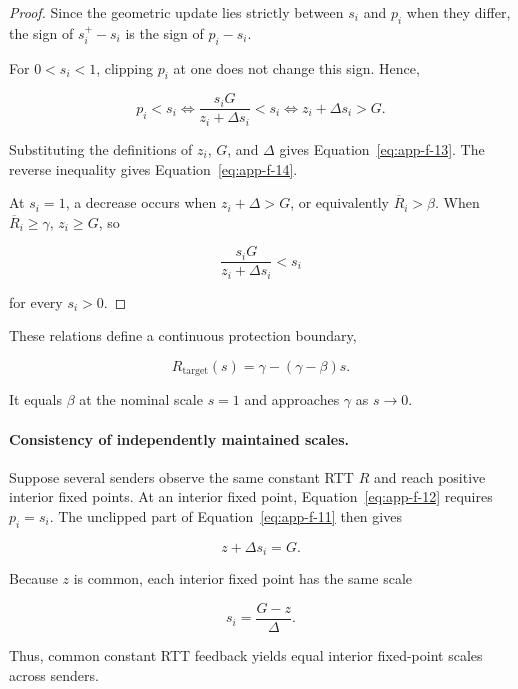 \begin{proof} Since the geometric update lies strictly between \(s_i\) and \(p_i\) when they differ, the sign of \(s_i^+-s_i\) is the sign of \(p_i-s_i\).

For \(0<s_i<1\), clipping \(p_i\) at one does not change this sign. Hence,

\[
p_i<s_i
\Longleftrightarrow
\frac{s_iG}{z_i+\Delta s_i}<s_i
\Longleftrightarrow
z_i+\Delta s_i>G.
\]

Substituting the definitions of \(z_i\), \(G\), and \(\Delta\) gives Equation~\eqref{eq:app-f-13}. The reverse inequality gives Equation~\eqref{eq:app-f-14}.

At \(s_i=1\), a decrease occurs when \(z_i+\Delta>G\), or equivalently \(\overline R_i>\beta\). When \(\overline R_i\ge\gamma\), \(z_i\ge G\), so

\[
\frac{s_iG}{z_i+\Delta s_i}<s_i
\]

for every \(s_i>0\).
\end{proof}

These relations define a continuous protection boundary,

\begin{equation}
\label{eq:app-f-15}
R_{\mathrm{target}}(s)
=
\gamma-(\gamma-\beta)s.
\end{equation}

It equals \(\beta\) at the nominal scale \(s=1\) and approaches \(\gamma\) as \(s\to0\).

\paragraph{Consistency of independently maintained scales.}

Suppose several senders observe the same constant RTT \(R\) and reach positive interior fixed points. At an interior fixed point, Equation~\eqref{eq:app-f-12} requires \(p_i=s_i\). The unclipped part of Equation~\eqref{eq:app-f-11} then gives

\begin{equation}
\label{eq:app-f-16}
z+\Delta s_i=G.
\end{equation}

Because \(z\) is common, each interior fixed point has the same scale

\begin{equation}
\label{eq:app-f-17}
s_i=\frac{G-z}{\Delta}.
\end{equation}

Thus, common constant RTT feedback yields equal interior fixed-point scales across senders.

